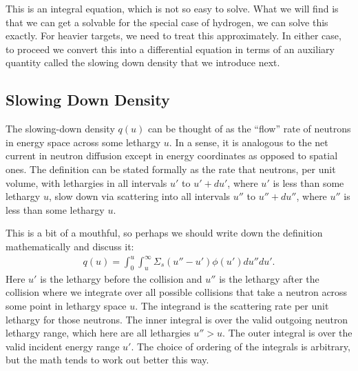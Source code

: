 This is an integral equation, which is not so easy to solve. What we will find is that we can get a solvable for the special case of hydrogen, we can solve this exactly. For heavier targets, we need to treat this approximately. In either case, to proceed we convert this into a differential equation in terms of an auxiliary quantity called the slowing down density that we introduce next.

\subsection{Slowing Down Density}

The slowing-down density $q(u)$ can be thought of as the ``flow'' rate of neutrons in energy space across some lethargy $u$. In a sense, it is analogous to the net current in neutron diffusion except in energy coordinates as opposed to spatial ones. The definition can be stated formally as the rate that neutrons, per unit volume, with lethargies in all intervals $u'$ to $u' + du'$, where $u'$ is less than some lethargy $u$, slow down via scattering into all intervals $u''$ to $u'' + du''$, where $u''$ is less than some lethargy $u$. 

This is a bit of a mouthful, so perhaps we should write down the definition mathematically and discuss it:
\begin{align}
  q(u) = \int_0^u \int_u^\infty \Sigma_s(u'' - u') \phi(u') du'' du' . \label{Eq:thermalization_slowingDensityDefinition}
\end{align}
Here $u'$ is the lethargy before the collision and $u''$ is the lethargy after the collision where we integrate over all possible collisions that take a neutron across some point in lethargy space $u$. The integrand is the scattering rate per unit lethargy for those neutrons. The inner integral is over the valid outgoing neutron lethargy range, which here are all lethargies $u'' > u$. The outer integral is over the valid incident energy range $u'$. The choice of ordering of the integrals is arbitrary, but the math tends to work out better this way.

